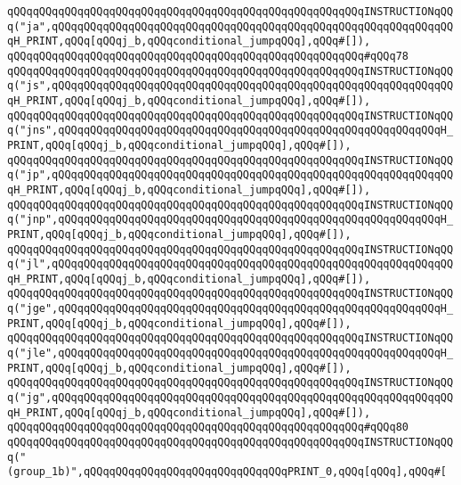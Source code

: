 \verb|qQQqqQQqqQQqqQQqqQQqqQQqqQQqqQQqqQQqqQQqqQQqqQQqqQQqqQQqINSTRUCTIONqQQq("ja",qQQqqQQqqQQqqQQqqQQqqQQqqQQqqQQqqQQqqQQqqQQqqQQqqQQqqQQqqQQqqQQqH_PRINT,qQQq[qQQqj_b,qQQqconditional_jumpqQQq],qQQq#[]),|\newline
\verb|qQQqqQQqqQQqqQQqqQQqqQQqqQQqqQQqqQQqqQQqqQQqqQQqqQQqqQQq#qQQq78|\newline
\verb|qQQqqQQqqQQqqQQqqQQqqQQqqQQqqQQqqQQqqQQqqQQqqQQqqQQqqQQqINSTRUCTIONqQQq("js",qQQqqQQqqQQqqQQqqQQqqQQqqQQqqQQqqQQqqQQqqQQqqQQqqQQqqQQqqQQqqQQqH_PRINT,qQQq[qQQqj_b,qQQqconditional_jumpqQQq],qQQq#[]),|\newline
\verb|qQQqqQQqqQQqqQQqqQQqqQQqqQQqqQQqqQQqqQQqqQQqqQQqqQQqqQQqINSTRUCTIONqQQq("jns",qQQqqQQqqQQqqQQqqQQqqQQqqQQqqQQqqQQqqQQqqQQqqQQqqQQqqQQqqQQqH_PRINT,qQQq[qQQqj_b,qQQqconditional_jumpqQQq],qQQq#[]),|\newline
\verb|qQQqqQQqqQQqqQQqqQQqqQQqqQQqqQQqqQQqqQQqqQQqqQQqqQQqqQQqINSTRUCTIONqQQq("jp",qQQqqQQqqQQqqQQqqQQqqQQqqQQqqQQqqQQqqQQqqQQqqQQqqQQqqQQqqQQqqQQqH_PRINT,qQQq[qQQqj_b,qQQqconditional_jumpqQQq],qQQq#[]),|\newline
\verb|qQQqqQQqqQQqqQQqqQQqqQQqqQQqqQQqqQQqqQQqqQQqqQQqqQQqqQQqINSTRUCTIONqQQq("jnp",qQQqqQQqqQQqqQQqqQQqqQQqqQQqqQQqqQQqqQQqqQQqqQQqqQQqqQQqqQQqH_PRINT,qQQq[qQQqj_b,qQQqconditional_jumpqQQq],qQQq#[]),|\newline
\verb|qQQqqQQqqQQqqQQqqQQqqQQqqQQqqQQqqQQqqQQqqQQqqQQqqQQqqQQqINSTRUCTIONqQQq("jl",qQQqqQQqqQQqqQQqqQQqqQQqqQQqqQQqqQQqqQQqqQQqqQQqqQQqqQQqqQQqqQQqH_PRINT,qQQq[qQQqj_b,qQQqconditional_jumpqQQq],qQQq#[]),|\newline
\verb|qQQqqQQqqQQqqQQqqQQqqQQqqQQqqQQqqQQqqQQqqQQqqQQqqQQqqQQqINSTRUCTIONqQQq("jge",qQQqqQQqqQQqqQQqqQQqqQQqqQQqqQQqqQQqqQQqqQQqqQQqqQQqqQQqqQQqH_PRINT,qQQq[qQQqj_b,qQQqconditional_jumpqQQq],qQQq#[]),|\newline
\verb|qQQqqQQqqQQqqQQqqQQqqQQqqQQqqQQqqQQqqQQqqQQqqQQqqQQqqQQqINSTRUCTIONqQQq("jle",qQQqqQQqqQQqqQQqqQQqqQQqqQQqqQQqqQQqqQQqqQQqqQQqqQQqqQQqqQQqH_PRINT,qQQq[qQQqj_b,qQQqconditional_jumpqQQq],qQQq#[]),|\newline
\verb|qQQqqQQqqQQqqQQqqQQqqQQqqQQqqQQqqQQqqQQqqQQqqQQqqQQqqQQqINSTRUCTIONqQQq("jg",qQQqqQQqqQQqqQQqqQQqqQQqqQQqqQQqqQQqqQQqqQQqqQQqqQQqqQQqqQQqqQQqH_PRINT,qQQq[qQQqj_b,qQQqconditional_jumpqQQq],qQQq#[]),|\newline
\verb|qQQqqQQqqQQqqQQqqQQqqQQqqQQqqQQqqQQqqQQqqQQqqQQqqQQqqQQq#qQQq80|\newline
\verb|qQQqqQQqqQQqqQQqqQQqqQQqqQQqqQQqqQQqqQQqqQQqqQQqqQQqqQQqINSTRUCTIONqQQq("(group_1b)",qQQqqQQqqQQqqQQqqQQqqQQqqQQqqQQqPRINT_0,qQQq[qQQq],qQQq#[|\newline
